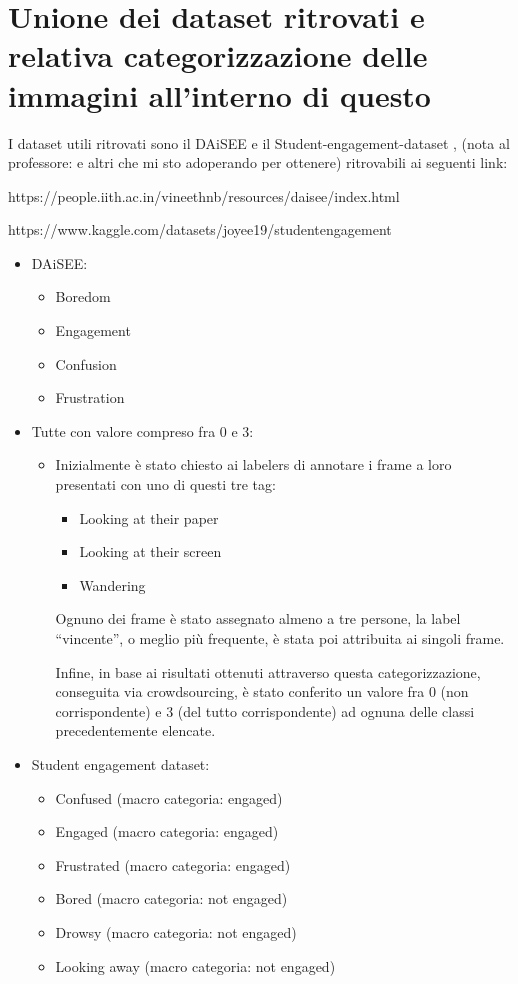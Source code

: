 \newpage

\section{Unione dei dataset ritrovati e relativa categorizzazione delle immagini all’interno di questo}

I dataset utili ritrovati sono il DAiSEE \cite{DAiSEE} e il Student-engagement-dataset \cite{StudEngagDataset}, (nota al professore: e altri che mi sto adoperando per ottenere) ritrovabili ai seguenti link:

https://people.iith.ac.in/vineethnb/resources/daisee/index.html

https://www.kaggle.com/datasets/joyee19/studentengagement

\begin{itemize}
    \item DAiSEE:
    \begin{itemize}
        \item Boredom
        \item Engagement
        \item Confusion
        \item Frustration
    \end{itemize}
    \item Tutte con valore compreso fra 0 e 3:
    \begin{itemize}
        \item Inizialmente è stato chiesto ai labelers di annotare i frame a loro presentati con uno di questi tre tag:
        \begin{itemize}
            \item Looking at their paper
            \item Looking at their screen
            \item Wandering
        \end{itemize}
            
        Ognuno dei frame è stato assegnato almeno a tre persone, la label “vincente”, o meglio più frequente, è stata poi attribuita ai singoli frame.

        Infine, in base ai risultati ottenuti attraverso questa categorizzazione, conseguita via crowdsourcing, è stato conferito un valore fra 0 (non corrispondente) e 3 (del tutto corrispondente) ad ognuna delle classi precedentemente elencate.
    \end{itemize}
    \item Student engagement dataset:
    \begin{itemize}
        \item Confused (macro categoria: engaged)
        \item Engaged (macro categoria: engaged)
        \item Frustrated (macro categoria: engaged)
        \item Bored (macro categoria: not engaged)
        \item Drowsy (macro categoria: not engaged)
        \item Looking away (macro categoria: not engaged)
    \end{itemize}
\end{itemize}

